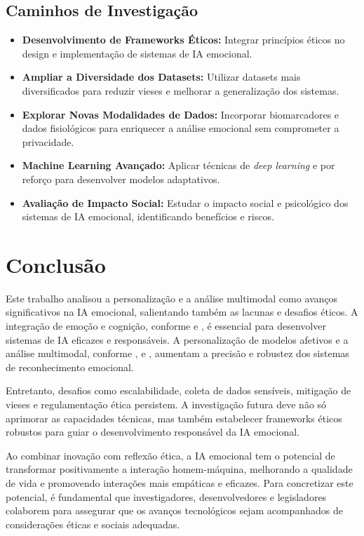 \documentclass[a4paper,12pt]{report}
\begin{document}
	\subsection{Caminhos de Investigação}
	
	\begin{itemize}
		\item \textbf{Desenvolvimento de Frameworks Éticos:} Integrar princípios éticos no design e implementação de sistemas de IA emocional.
		\item \textbf{Ampliar a Diversidade dos Datasets:} Utilizar datasets mais diversificados para reduzir vieses e melhorar a generalização dos sistemas.
		\item \textbf{Explorar Novas Modalidades de Dados:} Incorporar biomarcadores e dados fisiológicos para enriquecer a análise emocional sem comprometer a privacidade.
		\item \textbf{Machine Learning Avançado:} Aplicar técnicas de \textit{deep learning} e por reforço para desenvolver modelos adaptativos.
		\item \textbf{Avaliação de Impacto Social:} Estudar o impacto social e psicológico dos sistemas de IA emocional, identificando benefícios e riscos.
	\end{itemize}
	
	
	
	
	\section{Conclusão}
	
	Este trabalho analisou a personalização e a análise multimodal como avanços significativos na IA emocional, salientando também as lacunas e desafios éticos. A integração de emoção e cognição, conforme \textcite{pessoa2013} e \textcite{haidt2001}, é essencial para desenvolver sistemas de IA eficazes e responsáveis. A personalização de modelos afetivos e a análise multimodal, conforme \textcite{kargarandehkordi2024}, \textcite{gursesli2024} e \textcite{lee2024}, aumentam a precisão e robustez dos sistemas de reconhecimento emocional.
	
	Entretanto, desafios como escalabilidade, coleta de dados sensíveis, mitigação de vieses e regulamentação ética persistem. A investigação futura deve não só aprimorar as capacidades técnicas, mas também estabelecer frameworks éticos robustos para guiar o desenvolvimento responsável da IA emocional.
	
	Ao combinar inovação com reflexão ética, a IA emocional tem o potencial de transformar positivamente a interação homem-máquina, melhorando a qualidade de vida e promovendo interações mais empáticas e eficazes. Para concretizar este potencial, é fundamental que investigadores, desenvolvedores e legisladores colaborem para assegurar que os avanços tecnológicos sejam acompanhados de considerações éticas e sociais adequadas.
	
	
	\newpage
	
	\printbibliography
\end{document}
